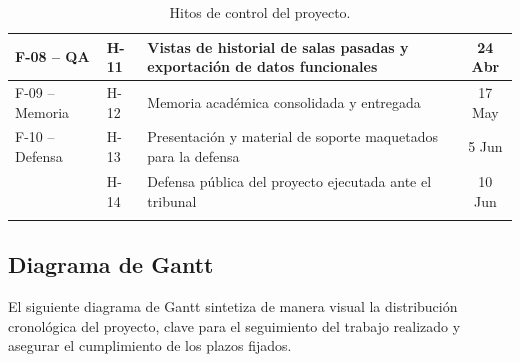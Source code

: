 \begin{table}[H]
{\begin{tabularx}{1\textwidth}{llYc}
F-08 -- QA & H-11 & Vistas de historial de salas pasadas y exportación de datos funcionales & 24 Abr \\ \hline

F-09 -- Memoria & H-12 & Memoria académica consolidada y entregada & 17 May \\ \hline

F-10 -- Defensa & H-13 & Presentación y material de soporte maquetados para la defensa & 5 Jun \\ 
& H-14 & Defensa pública del proyecto ejecutada ante el tribunal & 10 Jun \\ \bighline
\end{tabularx}%
}
\caption{Hitos de control del proyecto.}
\label{tab:lista_hitos}
\end{table}


\subsection{Diagrama de Gantt}\label{sub:diagrama_de_gantt}
El siguiente diagrama de Gantt\cite{wilson2003gantt} sintetiza de manera visual la distribución cronológica del proyecto, clave para el seguimiento del trabajo realizado y asegurar el cumplimiento de los plazos fijados.

